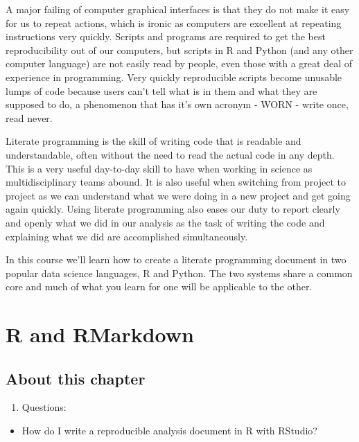 \documentclass[
]{book}
\providecommand{\tightlist}{%
  \setlength{\itemsep}{0pt}\setlength{\parskip}{0pt}}
\begin{document}
A major failing of computer graphical interfaces is that they do not make it easy for us to repeat actions, which is ironic as computers are excellent at repeating instructions very quickly. Scripts and programs are required to get the best reproducibility out of our computers, but scripts in R and Python (and any other computer language) are not easily read by people, even those with a great deal of experience in programming. Very quickly reproducible scripts become unusable lumps of code because users can't tell what is in them and what they are supposed to do, a phenomenon that has it's own acronym - WORN - write once, read never.

Literate programming is the skill of writing code that is readable and understandable, often without the need to read the actual code in any depth. This is a very useful day-to-day skill to have when working in science as multidisciplinary teams abound. It is also useful when switching from project to project as we can understand what we were doing in a new project and get going again quickly. Using literate programming also eases our duty to report clearly and openly what we did in our analysis as the task of writing the code and explaining what we did are accomplished simultaneously.

In this course we'll learn how to create a literate programming document in two popular data science languages, R and Python. The two systems share a common core and much of what you learn for one will be applicable to the other.

\hypertarget{r-and-rmarkdown}{%
\chapter{R and RMarkdown}\label{r-and-rmarkdown}}

\hypertarget{about-this-chapter}{%
\section{About this chapter}\label{about-this-chapter}}

\begin{enumerate}
\def\labelenumi{\arabic{enumi}.}
\tightlist
\item
  Questions:
\end{enumerate}

\begin{itemize}
\tightlist
\item
  How do I write a reproducible analysis document in R with RStudio?
\end{itemize}
\end{document}
